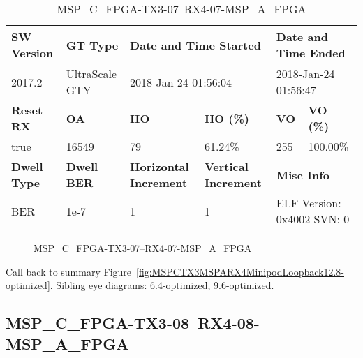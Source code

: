 \begin{table}[h]
\centering
\caption{MSP\_C\_FPGA-TX3-07--RX4-07-MSP\_A\_FPGA}
\label{tab:MSPCFPGATX307RX407MSPAFPGA12.8-optimized}
\begin{tabular}{@{}|l|l|l|l|l|l|@{}}
\toprule
\textbf{SW Version}                & \textbf{GT Type}   & \multicolumn{2}{l|}{\textbf{Date and Time Started}}            & \multicolumn{2}{l|}{\textbf{Date and Time Ended}}        \\ \midrule
2017.2                       & UltraScale GTY          & \multicolumn{2}{l|}{2018-Jan-24 01:56:04}                   & \multicolumn{2}{l|}{2018-Jan-24 01:56:47}               \\ \midrule
\textbf{Reset RX}                  & \textbf{OA} & \textbf{HO}   & \textbf{HO (\%)} & \textbf{VO} & \textbf{VO (\%)} \\ \midrule
true & 16549        & 79          & 61.24\%        & 255        & 100.00\%       \\ \midrule
\textbf{Dwell Type}                & \textbf{Dwell BER} & \textbf{Horizontal Increment} & \textbf{Vertical Increment}    & \multicolumn{2}{l|}{\textbf{Misc Info}}                  \\ \midrule
BER                            & 1e-7        & 1        & 1           & \multicolumn{2}{l|}{ELF Version: 0x4002 SVN: 0}                         \\ \bottomrule
\end{tabular}
\end{table}

\begin{figure}[h]
\caption{MSP\_C\_FPGA-TX3-07--RX4-07-MSP\_A\_FPGA} \label{fig:MSPCFPGATX307RX407MSPAFPGA12.8-optimized}
\end{figure}

Call back to summary Figure~\ref{fig:MSPCTX3MSPARX4MinipodLoopback12.8-optimized}.
Sibling eye diagrams: \hyperref[sec:MSPCFPGATX307RX407MSPAFPGA6.4-optimized]{6.4-optimized}, \hyperref[sec:MSPCFPGATX307RX407MSPAFPGA9.6-optimized]{9.6-optimized}.

\clearpage
\newpage


\subsection{MSP\_C\_FPGA-TX3-08--RX4-08-MSP\_A\_FPGA}\label{sec:MSPCFPGATX308RX408MSPAFPGA12.8-optimized}

